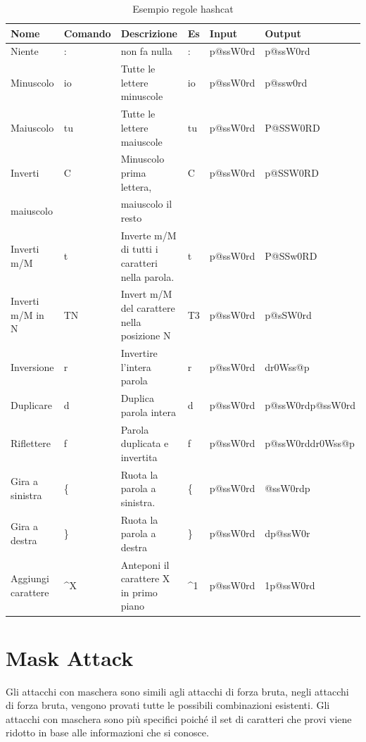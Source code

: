 \begin{table}[htbp]
    \begin{center}
    \begin{tabular}{|p{1.5cm}|l|p{}|l|l|l|}
    \hline
    \textbf{Nome} & \textbf{Comando} & \textbf{Descrizione} & \textbf{Es} & \textbf{Input} & \textbf{Output} \\
    \hline
    Niente & : & non fa nulla & : & p@ssW0rd & p@ssW0rd\\
    \hline
    Minuscolo & io & Tutte le lettere minuscole	 & io & p@ssW0rd & p@ssw0rd	 \\
    \hline
    Maiuscolo & tu & Tutte le lettere maiuscole & tu & p@ssW0rd & P@SSW0RD\\
    \hline
    Inverti & C & Minuscolo prima lettera,& C & p@ssW0rd & p@SSW0RD \\
    maiuscolo&  &  maiuscolo il resto &  &  &  \\
    \hline
    Inverti m/M & t & Inverte m/M di tutti i caratteri nella parola. & t & p@ssW0rd & P@SSw0RD\\
    \hline
    Inverti m/M in N& TN & Invert m/M del carattere nella posizione N & T3 & p@ssW0rd & p@sSW0rd\\
    \hline
    Inversione & r & Invertire l'intera parola & r & p@ssW0rd & dr0Wss@p\\
    \hline
    Duplicare & d & Duplica parola intera & d & p@ssW0rd & p@ssW0rdp@ssW0rd\\
    \hline
    Riflettere & f & Parola duplicata e invertita & f & p@ssW0rd & p@ssW0rddr0Wss@p \\
    \hline
    Gira a sinistra & \{ & Ruota la parola a sinistra. & \{ & p@ssW0rd & @ssW0rdp\\
    \hline
    Gira a destra & \} & Ruota la parola a destra & \} & p@ssW0rd & dp@ssW0r \\
    \hline
    Aggiungi carattere & \textasciicircum X & Anteponi il carattere X in primo piano & \textasciicircum 1 & p@ssW0rd & 1p@ssW0rd\\
    \hline
    \end{tabular}
    \end{center}
    \caption{Esempio regole hashcat}
    \label{tab:browser}
    \end{table}

\section{Mask Attack}
Gli attacchi con maschera \cite{Mask_attack} sono simili agli attacchi di forza bruta, negli attacchi di forza bruta, vengono provati tutte le possibili combinazioni esistenti. Gli attacchi con maschera sono più specifici poiché il set di caratteri che provi viene ridotto in base alle informazioni che si conosce.

